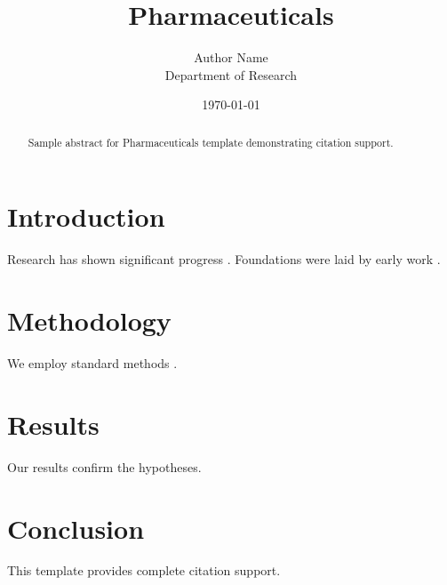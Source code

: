 \documentclass{mdpi}
\title{Pharmaceuticals}
\author{Author Name \\ \small Department of Research}
\date{\today}
\begin{document}
\maketitle

\begin{abstract}
Sample abstract for Pharmaceuticals template demonstrating citation support.
\end{abstract}

\section{Introduction}
Research has shown significant progress \citep{einstein1905}. Foundations were laid by early work \citep{turing1950}.

\section{Methodology}
We employ standard methods \citep{knuth1984}.

\section{Results}
Our results confirm the hypotheses.

\section{Conclusion}
This template provides complete citation support.



\end{document}
